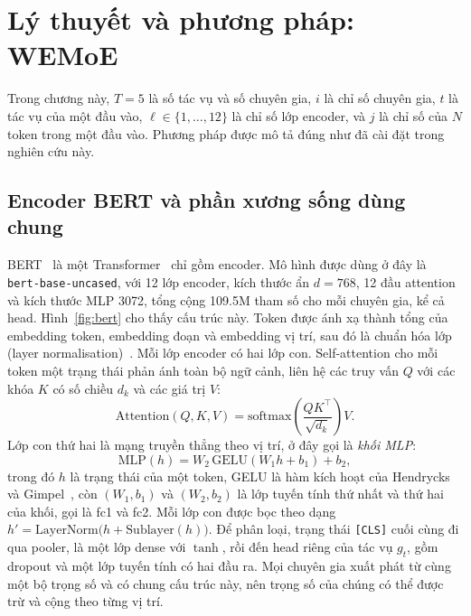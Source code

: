 \chapter{Lý thuyết và phương pháp: WEMoE}
\label{ch:theory}

Trong chương này, $T=5$ là số tác vụ và số chuyên gia, $i$ là chỉ số chuyên gia, $t$ là tác vụ của một đầu vào, $\ell\in\{1,\dots,12\}$ là chỉ số lớp encoder, và $j$ là chỉ số của $N$ token trong một đầu vào. Phương pháp được mô tả đúng như đã cài đặt trong nghiên cứu này.

\section{Encoder BERT và phần xương sống dùng chung}

BERT~\cite{devlin2019bert} là một Transformer~\cite{vaswani2017attention} chỉ gồm encoder. Mô hình được dùng ở đây là \texttt{bert-base-uncased}, với 12 lớp encoder, kích thước ẩn $d=768$, 12 đầu attention và kích thước MLP 3072, tổng cộng 109.5M tham số cho mỗi chuyên gia, kể cả head. Hình~\ref{fig:bert} cho thấy cấu trúc này. Token được ánh xạ thành tổng của embedding token, embedding đoạn và embedding vị trí, sau đó là chuẩn hóa lớp (layer normalisation)~\cite{ba2016layernorm}. Mỗi lớp encoder có hai lớp con. Self-attention cho mỗi token một trạng thái phản ánh toàn bộ ngữ cảnh, liên hệ các truy vấn $Q$ với các khóa $K$ có số chiều $d_k$ và các giá trị $V$:
\begin{equation}
\mathrm{Attention}(Q,K,V)=\mathrm{softmax}\!\left(\frac{QK^{\top}}{\sqrt{d_k}}\right)V .
\label{eq:attention}
\end{equation}
Lớp con thứ hai là mạng truyền thẳng theo vị trí, ở đây gọi là \emph{khối MLP}:
\begin{equation}
\mathrm{MLP}(h)=W_2\,\mathrm{GELU}(W_1h+b_1)+b_2 ,
\label{eq:ffn}
\end{equation}
trong đó $h$ là trạng thái của một token, GELU là hàm kích hoạt của Hendrycks và Gimpel~\cite{hendrycks2016gelu}, còn $(W_1,b_1)$ và $(W_2,b_2)$ là lớp tuyến tính thứ nhất và thứ hai của khối, gọi là fc1 và fc2. Mỗi lớp con được bọc theo dạng $h'=\mathrm{LayerNorm}\big(h+\mathrm{Sublayer}(h)\big)$. Để phân loại, trạng thái \texttt{[CLS]} cuối cùng đi qua pooler, là một lớp dense với $\tanh$, rồi đến head riêng của tác vụ $g_t$, gồm dropout và một lớp tuyến tính có hai đầu ra. Mọi chuyên gia xuất phát từ cùng một bộ trọng số và có chung cấu trúc này, nên trọng số của chúng có thể được trừ và cộng theo từng vị trí.

